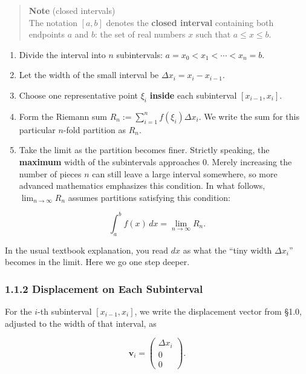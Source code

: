 \begin{quote}
\textbf{Note} (closed intervals)\\
The notation \([a,b]\) denotes the \textbf{closed interval} containing
both endpoints \(a\) and \(b\): the set of real numbers \(x\) such that
\(a \le x \le b\).
\end{quote}

\begin{enumerate}
\def\labelenumi{\arabic{enumi}.}
\tightlist
\item
  Divide the interval into \(n\) subintervals:
  \(a=x_0<x_1<\cdots<x_n=b\).
\item
  Let the width of the small interval be \(\Delta x_i=x_i-x_{i-1}\).
\item
  Choose one representative point \(\xi_i\) \textbf{inside} each
  subinterval \([x_{i-1},x_i]\).
\item
  Form the Riemann sum \(R_n:=\sum_{i=1}^n f(\xi_i)\Delta x_i\). We
  write the sum for this particular \(n\)-fold partition as \(R_n\).
\item
  Take the limit as the partition becomes finer. Strictly speaking, the
  \textbf{maximum} width of the subintervals approaches \(0\). Merely
  increasing the number of pieces \(n\) can still leave a large interval
  somewhere, so more advanced mathematics emphasizes this condition. In
  what follows, \(\lim_{n\to\infty}R_n\) assumes partitions satisfying
  this condition:
\end{enumerate}

\[
\int_a^b f(x)\,dx = \lim_{n\to\infty} R_n.
\]

In the usual textbook explanation, you read \(dx\) as what the ``tiny
width \(\Delta x_i\)'' becomes in the limit. Here we go one step deeper.

\hypertarget{displacement-on-each-subinterval}{%
\subsubsection{1.1.2 Displacement on Each
Subinterval}\label{displacement-on-each-subinterval}}

For the \(i\)-th subinterval \([x_{i-1},x_i]\), we write the
displacement vector from §1.0, adjusted to the width of that interval,
as

\[
\mathbf{v}_i = \begin{pmatrix} \Delta x_i \\ 0 \\ 0 \end{pmatrix}.
\]


